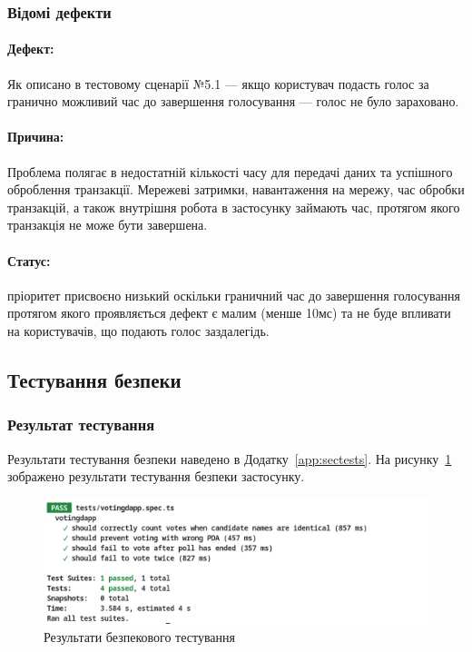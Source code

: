 \documentclass[14pt]{extreport}
\begin{document}
  \subsubsection*{Відомі дефекти}

  \paragraph{Дефект:} Як описано в тестовому сценарії №5.1 — якщо користувач подасть голос за гранично можливий час до завершення голосування — голос не було зараховано.

  \paragraph{Причина:} Проблема полягає в недостатній кількості часу для передачі даних та успішного оброблення транзакції. Мережеві затримки, навантаження на мережу, час обробки транзакцій, а також внутрішня робота в застосунку займають час, протягом якого транзакція не може бути завершена.

  \paragraph{Статус:} пріоритет присвоєно низький оскільки граничний час до завершення голосування протягом якого проявляється дефект є малим (менше 10мс) та не буде впливати на користувачів, що подають голос заздалегідь.
  
  \subsection{Тестування безпеки}
  
  \subsubsection*{Результат тестування}
  
  Результати тестування безпеки наведено в Додатку~\ref{app:sectests}. На рисунку~\ref{fig:sectests} зображено результати тестування безпеки застосунку.

  \begin{figure}[H]
    \centering
    \includegraphics[width=\textwidth]{SecTests}
    \caption{Результати безпекового тестування}
    \label{fig:sectests}
  \end{figure}
  
\end{document}

